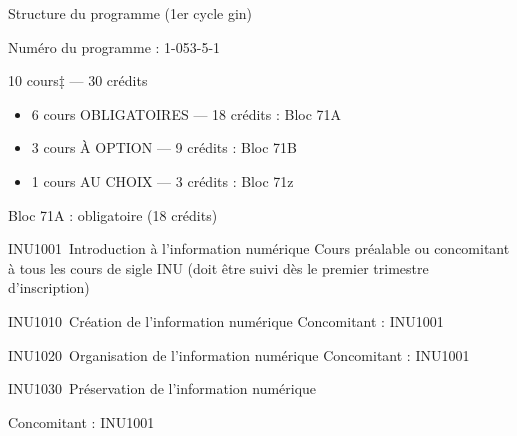 \documentclass [12 pt]{article}
\begin{document}
        Structure du programme (1er cycle gin)
        
            Numéro du programme : 1-053-5-1
            
                
                    10 cours‡ — 30 crédits
                
            
            
        \begin{itemize}
        
                
        \item 6 cours OBLIGATOIRES — 18 crédits : Bloc 71A
                
        \item 3 cours À OPTION — 9 crédits : Bloc 71B
                
        \item 1 cours AU CHOIX — 3 crédits : Bloc 71z
            
        \end{itemize}
    
            
                
                    
                        
                            
                                Bloc 71A : obligatoire (18 crédits)
                            
                        
                        
                            INU1001 Introduction à l'information numérique
                            Cours préalable ou concomitant à tous les cours
                                de sigle INU (doit être suivi dès le premier trimestre
                                d'inscription)
                        
                        
                            INU1010 Création de l'information numérique
                            Concomitant : INU1001
                        
                        
                            INU1020 Organisation de l'information numérique
                            Concomitant : INU1001
                        
                        
                            
                                INU1030 Préservation de
                                    l'information numérique
                            
                            Concomitant : INU1001
                        
\end{document}
